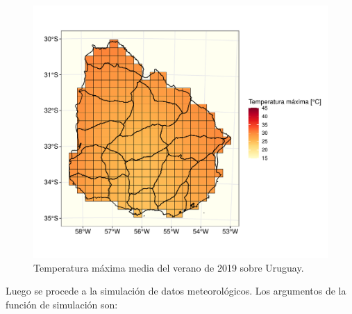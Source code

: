 \documentclass[
  12pt]{article}
\begin{document}
\begin{figure}[H]

{\centering \includegraphics{Manual_Generador_files/figure-latex/grilla-tmax-seasonal-1} 

}

\caption{Temperatura máxima media del verano de 2019 sobre Uruguay.}\label{fig:grilla-tmax-seasonal}
\end{figure}

Luego se procede a la simulación de datos meteorológicos. Los argumentos de la función de simulación son:
\end{document}

